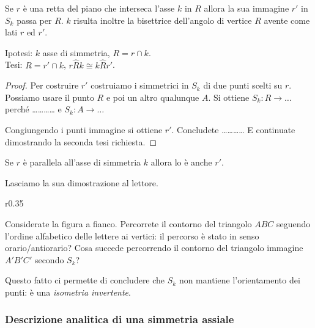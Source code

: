 \begin{teorema}\label{teo:8.4}
Se $r$ è una retta del piano che interseca l'asse $k$ in $R$ allora la sua immagine $r'$ in $S_k$ passa per $R$. $k$ risulta inoltre la bisettrice dell'angolo di vertice $R$ avente come lati $r$ ed $r'$.
\end{teorema}

\noindent\begin{minipage}{0.65\textwidth}\parindent15pt
\noindent Ipotesi: $k$ asse di simmetria, $R=r\cap k$.\\
Tesi: $R=r'\cap k$, $r\widehat{R}k\cong k\widehat{R}r'$.

\begin{proof}
Per costruire $r'$ costruiamo i simmetrici in $S_k$ di due punti scelti su $r$. Possiamo usare il punto $R$ e poi un altro qualunque $A$. Si ottiene $S_k: R \rightarrow \ldots{}$ perché \ldots\ldots\ldots\ldots{} e $S_k: A \rightarrow \ldots{}$

Congiungendo i punti immagine si ottiene $r'$. Concludete \ldots\ldots\ldots\ldots{}
E continuate dimostrando la seconda tesi richiesta.
\end{proof}
\end{minipage}\hfil
\begin{minipage}{0.35\textwidth}
	\centering
\end{minipage}\vspace{5pt}

\begin{teorema}\label{teo:8.5}
Se $r$ è parallela all'asse di simmetria $k$ allora lo è anche $r'$.
\end{teorema}

Lasciamo la sua dimostrazione al lettore.

\setlength{\intextsep}{3pt plus 2.0pt minus 2.0pt}
\begin{wrapfigure}{r}{0.35\textwidth}
	\centering
\end{wrapfigure}
Considerate la figura a fianco. Percorrete il contorno del triangolo $ABC$ seguendo l'ordine alfabetico delle lettere ai vertici: il percorso è stato in senso orario/antiorario? Cosa succede percorrendo il contorno del triangolo immagine $A'B'C'$ secondo $S_k$?

Questo fatto ci permette di concludere che $S_k$ non mantiene l'orientamento dei punti: è una \emph{isometria invertente}.

\subsubsection{Descrizione analitica di una simmetria assiale}

